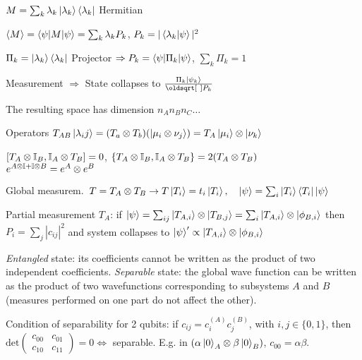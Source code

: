 \begin{squishlist}
\item $M = \sum_k \lambda_k \ket{\lambda_k} \bra{\lambda_k}$ Hermitian
\item $\braket{M} = \braket{\psi|M|\psi} = \sum_k \lambda_k P_k$, $P_k = |\braket{\lambda_k | \psi}|^2$
\item $\Pi_k = \ket{\lambda_k}\bra{\lambda_k}$ Projector $\Rightarrow P_k = \braket{\psi| \Pi_k | \psi}$, $\sum_k \Pi_k = 1$
\item Measurement $\Rightarrow$ State collapses to $\frac{\Pi_k \ket{\psi_k}}{\sqrt{P_k}}$
\end{squishlist}

\begin{squishlist}
\item The resulting space has dimension $n_A n_B n_C \ldots$
\item Operators $T_{AB} \ket{\lambda_ij} = (T_a \otimes T_b) (\ket{\mu_i \otimes \nu_j}) = T_A \ket{\mu_i} \otimes \ket{\nu_k}$
\item $[T_A \otimes \mathbb{I}_B, \mathbb{I}_A \otimes T_B] = 0$, \quad $\{ T_A \otimes \mathbb{I}_B, \mathbb{I}_A \otimes T_B\} = 2 (T_A \otimes T_B)$ \\
    $e^{A \otimes \mathbb{I} + \mathbb{I} \otimes B} = e^A \otimes e^B$

\item Global measurem.\ $T = T_A \otimes T_B \rightarrow T \ket{T_i} = t_i \ket{T_i}, \quad \ket{\psi} = \sum_i \ket{T_i} \bra{T_i}\ket{\psi}$ 
\item Partial measurement $T_A$: if $\ket{\psi} = \sum_{ij} \ket{T_{A,i}} \otimes \ket{T_{B,j}} = \sum_i \ket{T_{A,i}} \otimes \ket{\phi_{B,i}}$
    then $P_i = \sum_j |c_{ij}|^2$ and system collapses to $\ket{\psi}' \propto \ket{T_{A,i}} \otimes \ket{\phi_{B,i}}$

\item \emph{Entangled} state: its coefficients cannot be written as the product of two independent coefficients. 
    \emph{Separable} state: the global wave function can be written as the product of two wavefunctions corresponding to subsystems $A$ and $B$ (measures performed on one part do not affect the other).
\item Condition of separability for 2 qubits: if $c_{ij} = c^{(A)}_i c^{(B)}_j$, with $i,j\in \{0,1\}$, then
    $\mathrm{det} \begin{pmatrix} c_{00} & c_{01} \\ c_{10} & c_{11} \end{pmatrix} = 0 \Leftrightarrow $ separable. E.g. in $\left(\alpha \ket{0}_A \otimes \beta \ket{0}_B\right)$, $c_{00} = \alpha \beta$.
\end{squishlist}

